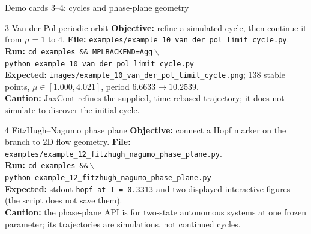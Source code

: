 \begin{frame}{Demo cards 3--4: cycles and phase-plane geometry}
\scriptsize
\begin{block}{3 \quad Van der Pol periodic orbit}
\textbf{Objective:} refine a simulated cycle, then continue it from $\mu=1$ to $4$.\quad
\textbf{File:} \texttt{examples/example\_10\_van\_der\_pol\_limit\_cycle.py}.\\
\textbf{Run:} \texttt{cd examples \&\& MPLBACKEND=Agg}\,$\backslash$\\
\hspace*{8mm}\texttt{python example\_10\_van\_der\_pol\_limit\_cycle.py}\\
\textbf{Expected:} \texttt{images/example\_10\_van\_der\_pol\_limit\_cycle.png};
138 stable points, $\mu\in[1.000,4.021]$, period $6.6633\to10.2539$.\\
\textbf{Caution:} JaxCont refines the supplied, time-rebased trajectory; it
does not simulate to discover the initial cycle.
\end{block}

\begin{block}{4 \quad FitzHugh--Nagumo phase plane}
\textbf{Objective:} connect a Hopf marker on the branch to 2D flow geometry.\quad
\textbf{File:} \texttt{examples/example\_12\_fitzhugh\_nagumo\_phase\_plane.py}.\\
\textbf{Run:} \texttt{cd examples \&\&}\,$\backslash$\\
\hspace*{8mm}\texttt{python example\_12\_fitzhugh\_nagumo\_phase\_plane.py}\\
\textbf{Expected:} stdout \texttt{hopf at I = 0.3313} and two displayed
interactive figures (the script does not save them).\\
\textbf{Caution:} the phase-plane API is for two-state autonomous systems at
one frozen parameter; its trajectories are simulations, not continued cycles.
\end{block}
\end{frame}

